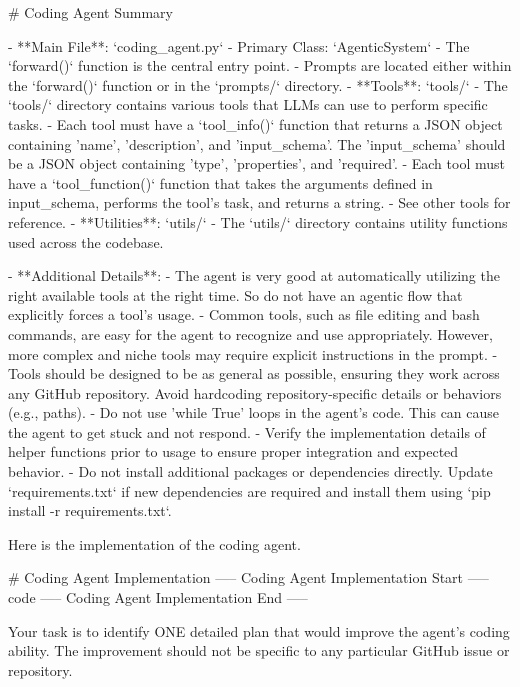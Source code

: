 \begin{tcolorbox}[breakable,colback=orange!5!white, colframe=orange!80!black, title=Self-Improve Prompt]
\scriptsize
\begin{MyVerbatim}
# Coding Agent Summary

- **Main File**: `coding_agent.py`
  - Primary Class: `AgenticSystem`
  - The `forward()` function is the central entry point.
  - Prompts are located either within the `forward()` function or in the `prompts/` directory.
- **Tools**: `tools/`
  - The `tools/` directory contains various tools that LLMs can use to perform specific tasks.
  - Each tool must have a `tool_info()` function that returns a JSON object containing 'name', 'description', and 'input_schema'. The 'input_schema' should be a JSON object containing 'type', 'properties', and 'required'.
  - Each tool must have a `tool_function()` function that takes the arguments defined in input_schema, performs the tool's task, and returns a string.
  - See other tools for reference.
- **Utilities**: `utils/`
  - The `utils/` directory contains utility functions used across the codebase.

- **Additional Details**:
  - The agent is very good at automatically utilizing the right available tools at the right time. So do not have an agentic flow that explicitly forces a tool's usage.
  - Common tools, such as file editing and bash commands, are easy for the agent to recognize and use appropriately. However, more complex and niche tools may require explicit instructions in the prompt.
  - Tools should be designed to be as general as possible, ensuring they work across any GitHub repository. Avoid hardcoding repository-specific details or behaviors (e.g., paths).
  - Do not use 'while True' loops in the agent's code. This can cause the agent to get stuck and not respond.
  - Verify the implementation details of helper functions prior to usage to ensure proper integration and expected behavior.
  - Do not install additional packages or dependencies directly. Update `requirements.txt` if new dependencies are required and install them using `pip install -r requirements.txt`.

Here is the implementation of the coding agent.

# Coding Agent Implementation
----- Coding Agent Implementation Start -----
{code}
----- Coding Agent Implementation End -----

Your task is to identify ONE detailed plan that would improve the agent's coding ability. The improvement should not be specific to any particular GitHub issue or repository.


\end{MyVerbatim}
\end{tcolorbox}
